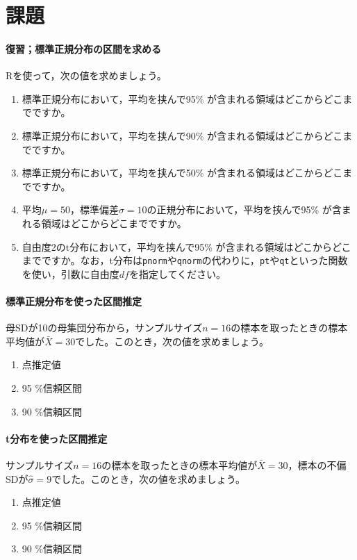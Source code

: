 \documentclass{ltjsbook}
\begin{document}
\section{課題}
\paragraph{復習；標準正規分布の区間を求める}
Rを使って，次の値を求めましょう。
\begin{enumerate}
    \item 標準正規分布において，平均を挟んで95\% が含まれる領域はどこからどこまでですか。
    \item 標準正規分布において，平均を挟んで90\% が含まれる領域はどこからどこまでですか。
    \item 標準正規分布において，平均を挟んで50\% が含まれる領域はどこからどこまでですか。
    \item 平均$\mu=50$，標準偏差$\sigma = 10$の正規分布において，平均を挟んで95\% が含まれる領域はどこからどこまでですか。
    \item 自由度2のt分布において，平均を挟んで95\% が含まれる領域はどこからどこまでですか。なお，t分布は\texttt{pnorm}や\texttt{qnorm}の代わりに，\texttt{pt}や\texttt{qt}といった関数を使い，引数に自由度$df$を指定してください。
\end{enumerate}

\paragraph{標準正規分布を使った区間推定}
母SDが10の母集団分布から，サンプルサイズ$n=16$の標本を取ったときの標本平均値が$\bar{X}=30$でした。このとき，次の値を求めましょう。
\begin{enumerate}
    \item 点推定値
    \item 95 \%信頼区間
    \item 90 \%信頼区間
\end{enumerate}

\paragraph{t分布を使った区間推定}
サンプルサイズ$n=16$の標本を取ったときの標本平均値が$\bar{X}=30$，標本の不偏SDが$\hat{\sigma}=9$でした。このとき，次の値を求めましょう。
\begin{enumerate}
    \item 点推定値
    \item 95 \%信頼区間
    \item 90 \%信頼区間
\end{enumerate}
\end{document}
